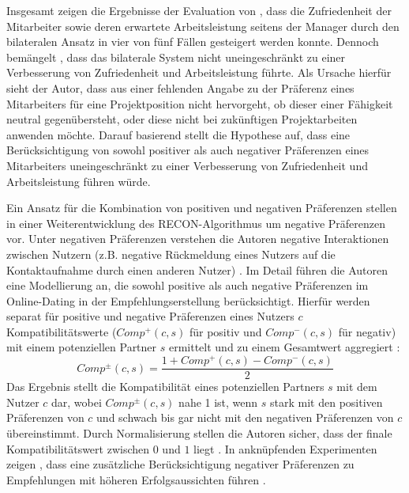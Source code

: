 Insgesamt zeigen die Ergebnisse der Evaluation von \textcite[S. 62]{link:booklet}, dass die Zufriedenheit der Mitarbeiter sowie deren erwartete Arbeitsleistung seitens der Manager durch den bilateralen Ansatz in vier von fünf Fällen gesteigert werden konnte.
Dennoch bemängelt \textcite[S. 69]{link:booklet}, dass das bilaterale System nicht uneingeschränkt zu einer Verbesserung von Zufriedenheit und Arbeitsleistung führte.
Als Ursache hierfür sieht der Autor, dass aus einer fehlenden Angabe zu der Präferenz eines Mitarbeiters für eine Projektposition nicht hervorgeht, ob dieser einer Fähigkeit neutral gegenübersteht, oder diese nicht bei zukünftigen Projektarbeiten anwenden möchte.
Darauf basierend stellt \textcite[S. 69]{link:booklet} die Hypothese auf, dass eine Berücksichtigung von sowohl positiver als auch negativer Präferenzen eines Mitarbeiters uneingeschränkt zu einer Verbesserung von Zufriedenheit und Arbeitsleistung führen würde.

Ein Ansatz für die Kombination von positiven und negativen Präferenzen stellen \textcite[S. 269ff.]{pizzato:2:inproceedings} in einer Weiterentwicklung des RECON-Algorithmus um negative Präferenzen vor.
Unter negativen Präferenzen verstehen die Autoren negative Interaktionen zwischen Nutzern (z.B. negative Rückmeldung eines Nutzers auf die Kontaktaufnahme durch einen anderen Nutzer) \cite[S. 273]{pizzato:2:inproceedings}.
Im Detail führen die Autoren eine Modellierung an, die sowohl positive als auch negative Präferenzen im Online-Dating in der Empfehlungserstellung berücksichtigt.
Hierfür werden separat für positive und negative Präferenzen eines Nutzers $c$ Kompatibilitätswerte ($Comp^{+}(c,s)$ für positiv und $Comp^{-}(c,s)$ für negativ) mit einem potenziellen Partner $s$ ermittelt und zu einem Gesamtwert aggregiert \cite[S. 273]{pizzato:2:inproceedings}:
\begin{equation}\label{eq39}
    Comp^{\pm}(c,s)=\frac{1+Comp^{+}(c,s)-Comp^{-}(c,s)}{2}
\end{equation}
Das Ergebnis stellt die Kompatibilität eines potenziellen Partners $s$ mit dem Nutzer $c$ dar, wobei $Comp^{\pm}(c,s)$ nahe 1 ist, wenn $s$ stark mit den positiven Präferenzen von $c$ und schwach bis gar nicht mit den negativen Präferenzen von $c$ übereinstimmt.
Durch Normalisierung stellen die Autoren sicher, dass der finale Kompatibilitätswert zwischen $0$ und $1$ liegt \cite[S. 273]{pizzato:2:inproceedings}.
In anknüpfenden Experimenten zeigen \textcite[S. 279]{pizzato:2:inproceedings}, dass eine zusätzliche Berücksichtigung negativer Präferenzen zu Empfehlungen mit höheren Erfolgsaussichten führen \cite[S. 279]{pizzato:2:inproceedings}.

